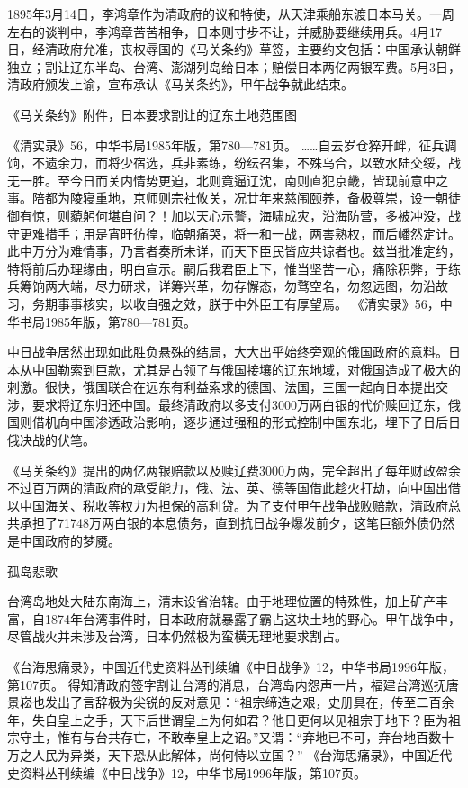 \documentclass[12pt,UTF8]{ctexbook}
\begin{document}
1895年3月14日，李鸿章作为清政府的议和特使，从天津乘船东渡日本马关。一周左右的谈判中，李鸿章苦苦相争，日本则寸步不让，并威胁要继续用兵。4月17日，经清政府允准，丧权辱国的《马关条约》草签，主要约文包括：中国承认朝鲜独立；割让辽东半岛、台湾、澎湖列岛给日本；赔偿日本两亿两银军费。5月3日，清政府颁发上谕，宣布承认《马关条约》，甲午战争就此结束。


《马关条约》附件，日本要求割让的辽东土地范围图

《清实录》56，中华书局1985年版，第780—781页。
……自去岁仓猝开衅，征兵调饷，不遗余力，而将少宿选，兵非素练，纷纭召集，不殊乌合，以致水陆交绥，战无一胜。至今日而关内情势更迫，北则竟逼辽沈，南则直犯京畿，皆现前意中之事。陪都为陵寝重地，京师则宗社攸关，况廿年来慈闱颐养，备极尊崇，设一朝徒御有惊，则藐躬何堪自问？！加以天心示警，海啸成灾，沿海防营，多被冲没，战守更难措手；用是宵旰彷徨，临朝痛哭，将一和一战，两害熟权，而后幡然定计。此中万分为难情事，乃言者奏所未详，而天下臣民皆应共谅者也。兹当批准定约，特将前后办理缘由，明白宣示。嗣后我君臣上下，惟当坚苦一心，痛除积弊，于练兵筹饷两大端，尽力研求，详筹兴革，勿存懈态，勿骛空名，勿忽远图，勿沿故习，务期事事核实，以收自强之效，朕于中外臣工有厚望焉。 《清实录》56，中华书局1985年版，第780—781页。

中日战争居然出现如此胜负悬殊的结局，大大出乎始终旁观的俄国政府的意料。日本从中国勒索到巨款，尤其是占领了与俄国接壤的辽东地域，对俄国造成了极大的刺激。很快，俄国联合在远东有利益索求的德国、法国，三国一起向日本提出交涉，要求将辽东归还中国。最终清政府以多支付3000万两白银的代价赎回辽东，俄国则借机向中国渗透政治影响，逐步通过强租的形式控制中国东北，埋下了日后日俄决战的伏笔。

《马关条约》提出的两亿两银赔款以及赎辽费3000万两，完全超出了每年财政盈余不过百万两的清政府的承受能力，俄、法、英、德等国借此趁火打劫，向中国出借以中国海关、税收等权力为担保的高利贷。为了支付甲午战争战败赔款，清政府总共承担了71748万两白银的本息债务，直到抗日战争爆发前夕，这笔巨额外债仍然是中国政府的梦魇。

孤岛悲歌

台湾岛地处大陆东南海上，清末设省治辖。由于地理位置的特殊性，加上矿产丰富，自1874年台湾事件时，日本政府就暴露了霸占这块土地的野心。甲午战争中，尽管战火并未涉及台湾，日本仍然极为蛮横无理地要求割占。

《台海思痛录》，中国近代史资料丛刊续编《中日战争》12，中华书局1996年版，第107页。
得知清政府签字割让台湾的消息，台湾岛内怨声一片，福建台湾巡抚唐景崧也发出了言辞极为尖锐的反对意见：“祖宗缔造之艰，史册具在，传至二百余年，失自皇上之手，天下后世谓皇上为何如君？他日更何以见祖宗于地下？臣为祖宗守土，惟有与台共存亡，不敢奉皇上之诏。”又谓：“弃地已不可，弃台地百数十万之人民为异类，天下恐从此解体，尚何恃以立国？” 《台海思痛录》，中国近代史资料丛刊续编《中日战争》12，中华书局1996年版，第107页。
\end{document}
